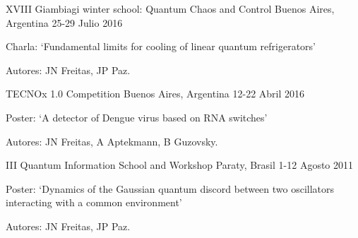 \begin{confentries}
  \confentry
    {XVIII Giambiagi winter school: Quantum Chaos and Control} %
    {Buenos Aires, Argentina} %
    {25-29 Julio 2016} %
    {
    \begin{cvitems}
    \item Charla: ‘Fundamental limits for cooling of linear quantum refrigerators’
    \item Autores: JN Freitas, JP Paz.
    \end{cvitems}
    }

  \confentry
    {TECNOx 1.0 Competition} %
    {Buenos Aires, Argentina} %
    {12-22 Abril 2016} %
    {
    \begin{cvitems}
    \item Poster: ‘A detector of Dengue virus based on RNA switches’
    \item Autores: JN Freitas, A Aptekmann, B Guzovsky.
    \end{cvitems}
    }

  \confentry
    {III Quantum Information School and Workshop} %
    {Paraty, Brasil} %
    {1-12 Agosto 2011} %
    {
    \begin{cvitems}
    \item Poster: ‘Dynamics of the Gaussian quantum discord between two oscillators interacting with a common environment'
    \item Autores: JN Freitas, JP Paz.
    \end{cvitems}
    }

\end{confentries}
